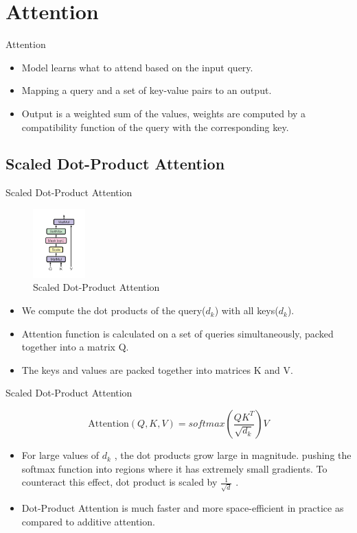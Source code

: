 \documentclass[10pt]{beamer}
\newcommand{\et}[1]{\textit{#1}}
\begin{document}
\section{Attention}
\begin{frame}{Attention}
	\begin{itemize}
		\item Model learns what to attend based on the input query.
		\item Mapping a query and a set of key-value pairs to an output.
		\item Output is a weighted sum of the values, weights are computed by a compatibility function of the query with the corresponding key.
	\end{itemize}

\end{frame}

\subsection{Scaled Dot-Product Attention}

\begin{frame}{Scaled Dot-Product Attention}
	\begin{figure}[ht!]
		\centering
		\includegraphics[height=100px]{includes/Attention-Dot.png}
		\caption{Scaled Dot-Product Attention \et{\citep[Source:][]{--Attention is all you need}}}
		\label{fig:dot-attention}
	\end{figure}
	\vspace{-20}
	\begin{itemize}
		\item We compute the dot products of the
			query($d_k$) with all keys($d_k$).
		\item Attention function is calculated on a set of queries simultaneously, packed together into a matrix Q.
		\item The keys and values are packed together into matrices K and V.
	\end{itemize}
\end{frame}

\begin{frame}{Scaled Dot-Product Attention}
	\begin{center}
		\[
			\text{Attention}(Q, K, V) = softmax(\frac{QK^{T}}{\sqrt{d_k}}) V
		\]
	\end{center}
	\begin{itemize}
		\item For large values of $d_k$ , the dot products grow large in magnitude. pushing the softmax function into regions where it has extremely small gradients. To counteract this effect, dot product is scaled by $\frac{1}{\sqrt{d}}$ .
		\item Dot-Product Attention is much faster and more space-efficient in practice as compared to additive attention.
	\end{itemize}
\end{frame}
\end{document}
